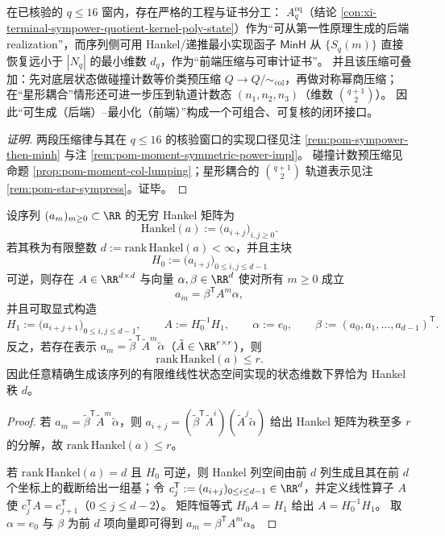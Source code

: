 \begin{conclusion}[二段式可执行压缩：\texorpdfstring{$\text{直积}\Rightarrow A^{\mathrm{eq}}_q\Rightarrow \mathsf{MinH}(S_q)$}{product=>Aeq=>MinH} 给出“后端可生成--前端最小证书”双轨闭环]\label{con:xi-terminal-two-stage-compression-sympower-minh}
在已核验的 \(q\le 16\) 窗内，存在严格的工程与证书分工：
\(A^{\mathrm{eq}}_q\)（结论 \ref{con:xi-terminal-sympower-quotient-kernel-poly-state}）作为“可从第一性原理生成的后端 realization”，而序列侧可用 Hankel/递推最小实现函子 \(\mathsf{MinH}\) 从 \(\{S_q(m)\}\) 直接恢复远小于 \(|N_q|\) 的最小维数 \(d_q\)，作为“前端压缩与可审计证书”。
并且该压缩可叠加：先对底层状态做碰撞计数等价类预压缩 \(Q\to Q/{\sim_{\mathrm{col}}}\)，再做对称幂商压缩；在“星形耦合”情形还可进一步压到轨道计数态 \((n_1,n_2,n_3)\)（维数 \(\binom{q+1}{2}\)）。
因此“可生成（后端）--最小化（前端）”构成一个可组合、可复核的闭环接口。
\end{conclusion}
\begin{proof}[证明]
两段压缩律与其在 \(q\le 16\) 的核验窗口的实现口径见注 \ref{rem:pom-sympower-then-minh} 与注 \ref{rem:pom-moment-symmetric-power-impl}。
碰撞计数预压缩见命题 \ref{prop:pom-moment-col-lumping}；星形耦合的 \(\binom{q+1}{2}\) 轨道表示见注 \ref{rem:pom-star-sympress}。证毕。
\end{proof}

\begin{theorem}\label{thm:xi-hankel-rank-minimal-linear-realization}
设序列 \((a_m)_{m\ge 0}\subset\RR\) 的无穷 Hankel 矩阵为
\[
\mathrm{Hankel}(a):=\bigl(a_{i+j}\bigr)_{i,j\ge 0}.
\]
若其秩为有限整数 \(d:=\mathrm{rank}\,\mathrm{Hankel}(a)<\infty\)，并且主块
\[
H_0:=\bigl(a_{i+j}\bigr)_{0\le i,j\le d-1}
\]
可逆，则存在 \(A\in\RR^{d\times d}\) 与向量 \(\alpha,\beta\in\RR^{d}\) 使对所有 \(m\ge 0\) 成立
\[
a_m=\beta^{\mathsf T}A^{m}\alpha,
\]
并且可取显式构造
\[
H_1:=\bigl(a_{i+j+1}\bigr)_{0\le i,j\le d-1},
\qquad
A:=H_0^{-1}H_1,\qquad
\alpha:=e_0,\qquad
\beta:=(a_0,a_1,\dots,a_{d-1})^{\mathsf T}.
\]
反之，若存在表示 \(a_m=\tilde\beta^{\mathsf T}\tilde A^{m}\tilde\alpha\)（\(\tilde A\in\RR^{r\times r}\)），则
\[
\mathrm{rank}\,\mathrm{Hankel}(a)\le r.
\]
因此任意精确生成该序列的有限维线性状态空间实现的状态维数下界恰为 Hankel 秩 \(d\)。
\end{theorem}
\begin{proof}
若 \(a_m=\tilde\beta^{\mathsf T}\tilde A^{m}\tilde\alpha\)，则
\(
a_{i+j}=(\tilde\beta^{\mathsf T}\tilde A^{i})(\tilde A^{j}\tilde\alpha)
\)
给出 Hankel 矩阵为秩至多 \(r\) 的分解，故 \(\mathrm{rank}\,\mathrm{Hankel}(a)\le r\)。
\par
若 \(\mathrm{rank}\,\mathrm{Hankel}(a)=d\) 且 \(H_0\) 可逆，则 Hankel 列空间由前 \(d\) 列生成且其在前 \(d\) 个坐标上的截断给出一组基；令 \(c_j^{\mathsf T}:=(a_{i+j})_{0\le i\le d-1}\in\RR^{d}\)，并定义线性算子 \(A\) 使 \(c_j^{\mathsf T}A=c_{j+1}^{\mathsf T}\)（\(0\le j\le d-2\)）。
矩阵恒等式 \(H_0A=H_1\) 给出 \(A=H_0^{-1}H_1\)。
取 \(\alpha=e_0\) 与 \(\beta\) 为前 \(d\) 项向量即可得到 \(a_m=\beta^{\mathsf T}A^{m}\alpha\)。
\end{proof}


